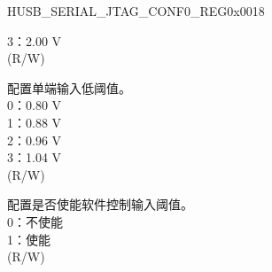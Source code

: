 \begin{register}{H}{USB\_SERIAL\_JTAG\_CONF0\_REG}{0x0018}
\begin{regdesc}
\begin{reglist}
3：2.00 V\\
(R/W)
\label{fielddesc:USBSERIALJTAGVREFL}\item [USB\_SERIAL\_JTAG\_VREFL] 配置单端输入低阈值。\\
0：0.80 V\\
1：0.88 V\\
2：0.96 V\\
3：1.04 V\\
(R/W)
\label{fielddesc:USBSERIALJTAGVREFOVERRIDE}\item [USB\_SERIAL\_JTAG\_VREF\_OVERRIDE] 配置是否使能软件控制输入阈值。\\
0：不使能\\
1：使能\\
(R/W)

\item [见下页...]
\end{reglist}\end{regdesc}
\end{register}
\addtocounter{Regfloat}{-1}
